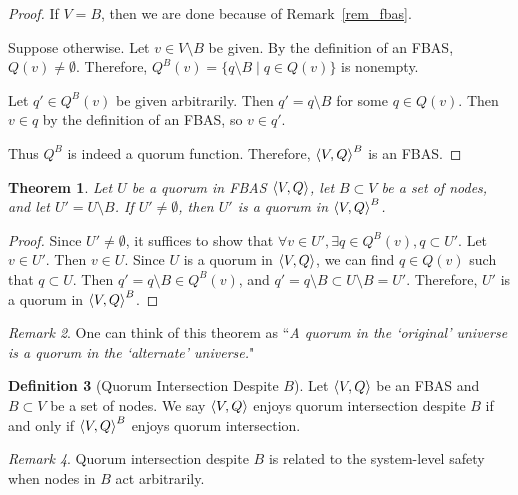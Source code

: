 \documentclass[12pt, psamsfonts]{amsart}
\newtheorem{thm}{Theorem}[subsection]
\theoremstyle{definition}
\newtheorem{defn}[thm]{Definition}
\theoremstyle{remark}
\newtheorem{rem}[thm]{Remark}
\numberwithin{equation}{subsection}
\begin{document}
\begin{proof}
    If $V = B$, then we are done because of Remark~\ref{rem_fbas}.

    Suppose otherwise.
    Let $v \in V \setminus B$ be given.
    By the definition of an FBAS, $Q(v) \ne \emptyset$.
    Therefore, $Q^B(v) = \{ q \setminus B \mid q \in Q(v) \}$ is nonempty.

    Let $q' \in Q^B(v)$ be given arbitrarily.
    Then $q' = q \setminus B$ for some $q \in Q(v)$.
    Then $v \in q$ by the definition of an FBAS, so $v \in q'$.
    
    Thus $Q^B$ is indeed a quorum function.
    Therefore, $\ev{V, Q}^B$ is an FBAS\@.
\end{proof}

\begin{thm}\label{quorum_delete_fbas}
    Let $U$ be a quorum in FBAS $\ev{V, Q}$, let $B \subset V$ be a set of nodes, and let $U' = U \setminus B$.
    If $U' \ne \emptyset$, then $U'$ is a quorum in $\ev{V, Q}^B$.
\end{thm}

\begin{proof}
    Since $U' \ne \emptyset$, it suffices to show that $\forall v \in U', \exists q \in Q^B(v), q \subset U'$.
    Let $v \in U'$.
    Then $v \in U$.
    Since $U$ is a quorum in $\ev{V, Q}$, we can find $q \in Q(v)$ such that $q \subset U$.
    Then $q' = q \setminus B \in Q^B(v)$, and $q' = q \setminus B \subset U \setminus B = U'$.
    Therefore, $U'$ is a quorum in $\ev{V, Q}^B$.
\end{proof}

\begin{rem}
    One can think of this theorem as ``\textit{A quorum in the `original' universe is a quorum in the `alternate' universe.}"
\end{rem}

\begin{defn}[Quorum Intersection Despite $B$]
    Let $\ev{V, Q}$ be an FBAS and $B \subset V$ be a set of nodes.
    We say $\ev{V, Q}$ enjoys quorum intersection despite $B$ if and only if $\ev{V, Q}^B$ enjoys quorum intersection.
\end{defn}

\begin{rem}
    Quorum intersection despite $B$ is related to the system-level safety when nodes in $B$ act arbitrarily.
\end{rem}
\end{document}
